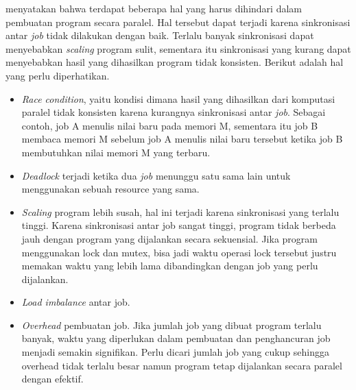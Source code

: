   \citep{structured_parallel_programming} menyatakan bahwa terdapat beberapa hal yang harus dihindari dalam pembuatan program secara paralel. Hal tersebut dapat terjadi karena sinkronisasi antar \textit{job} tidak dilakukan dengan baik. Terlalu banyak sinkronisasi dapat menyebabkan \textit{scaling} program sulit, sementara itu sinkronisasi yang kurang dapat menyebabkan hasil yang dihasilkan program tidak konsisten. Berikut adalah hal yang perlu diperhatikan.
  \begin{itemize}
    \item \textit{Race condition}, yaitu kondisi dimana hasil yang dihasilkan dari komputasi paralel tidak konsisten karena kurangnya sinkronisasi antar \textit{job}. Sebagai contoh, job A menulis nilai baru pada memori M, sementara itu job B membaca memori M sebelum job A menulis nilai baru tersebut ketika job B membutuhkan nilai memori M yang terbaru.
    \item \textit{Deadlock} terjadi ketika dua \textit{job} menunggu satu sama lain untuk menggunakan sebuah resource yang sama.
    \item \textit{Scaling} program lebih susah, hal ini terjadi karena sinkronisasi yang terlalu tinggi. Karena sinkronisasi antar job sangat tinggi, program tidak berbeda jauh dengan program yang dijalankan secara sekuensial. Jika program menggunakan lock dan mutex, bisa jadi waktu operasi lock tersebut justru memakan waktu yang lebih lama dibandingkan dengan job yang perlu dijalankan.
    \item \textit{Load imbalance} antar job.
    \item \textit{Overhead} pembuatan job. Jika jumlah job yang dibuat program terlalu banyak, waktu yang diperlukan dalam pembuatan dan penghancuran job menjadi semakin signifikan. Perlu dicari jumlah job yang cukup sehingga overhead tidak terlalu besar namun program tetap dijalankan secara paralel dengan efektif.
  \end{itemize}
